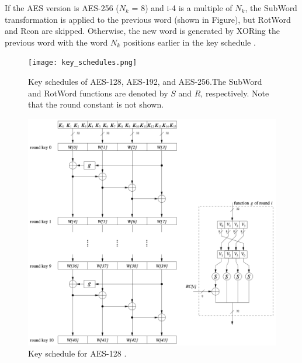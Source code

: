 If the AES version is AES-256 ($N_k$ = 8) and i-4 is a multiple of $N_k$, the SubWord transformation is applied to the 
previous word (shown in Figure), but RotWord and Rcon are skipped. Otherwise, the new word is generated by XORing the previous word 
with the word $N_k$ positions earlier in the key schedule \cite{NIST_AES}. 

\begin{figure}[h]
    \centering
    \texttt{[image: key\_schedules.png]} %
    \caption{
        Key schedules of AES-128, AES-192, and AES-256.The SubWord and
        RotWord functions are denoted by $S$ and $R$, respectively. Note that the round
        constant is not shown. \cite{Key_Collisions}
    }
    \label{fig:key_comb}
\end{figure}

\begin{figure}[h]
    \centering
    \includegraphics[width=.8\textwidth]{img/key-schedule-128.png}
    \caption{Key schedule for AES-128 \cite{Paar2024}.}
    \label{fig:key-schedule-128}
\end{figure}
